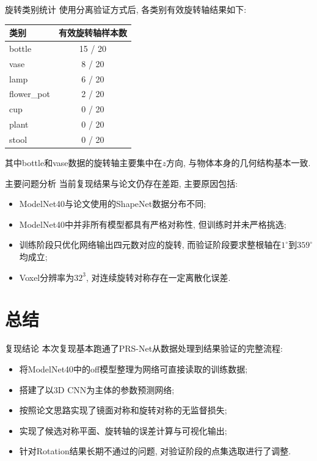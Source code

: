 \documentclass[UTF8, aspectratio=169, 11pt]{ctexbeamer}
\begin{document}
    \begin{frame}{旋转类别统计}
        使用分离验证方式后, 各类别有效旋转轴结果如下:
        \begin{table}
            \centering
            \begin{tabular}{lc}
                \toprule
                类别 & 有效旋转轴样本数 \\
                \midrule
                bottle & 15 / 20 \\
                vase & 8 / 20 \\
                lamp & 6 / 20 \\
                flower\_pot & 2 / 20 \\
                cup & 0 / 20 \\
                plant & 0 / 20 \\
                stool & 0 / 20 \\
                \bottomrule
            \end{tabular}
        \end{table}

        其中bottle和vase数据的旋转轴主要集中在$z$方向, 与物体本身的几何结构基本一致.
    \end{frame}

    \begin{frame}{主要问题分析}
        当前复现结果与论文仍存在差距, 主要原因包括:
        \begin{itemize}
            \item ModelNet40与论文使用的ShapeNet数据分布不同;
            \item ModelNet40中并非所有模型都具有严格对称性, 但训练时并未严格挑选;
            \item 训练阶段只优化网络输出四元数对应的旋转, 而验证阶段要求整根轴在$1^\circ$到$359^\circ$均成立;
            \item Voxel分辨率为$32^3$, 对连续旋转对称存在一定离散化误差.
        \end{itemize}
    \end{frame}

    \section{总结}

    \begin{frame}{复现结论}
        本次复现基本跑通了PRS-Net从数据处理到结果验证的完整流程:
        \begin{itemize}
            \item 将ModelNet40中的off模型整理为网络可直接读取的训练数据;
            \item 搭建了以3D CNN为主体的参数预测网络;
            \item 按照论文思路实现了镜面对称和旋转对称的无监督损失;
            \item 实现了候选对称平面、旋转轴的误差计算与可视化输出;
            \item 针对Rotation结果长期不通过的问题, 对验证阶段的点集选取进行了调整.
        \end{itemize}
    \end{frame}
\end{document}
